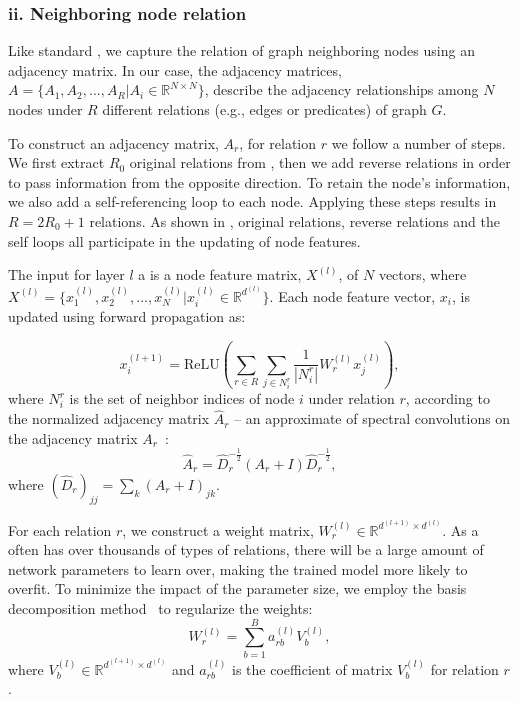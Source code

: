  \subsubsection{ii. Neighboring node relation}
 Like standard \RGCNs, we capture the relation of graph neighboring nodes using an adjacency matrix.
 In our case, the adjacency matrices, $A=\{A_1,A_2,...,A_R |A_i \in \mathbb{R}^{N
 \times N} \}$, describe the adjacency relationships among $N$ nodes under $R$ different relations (e.g., edges or predicates) of graph $G$.

 To construct an adjacency matrix, $A_r$, for relation $r$ we follow a number of steps. We first extract $R_0$ original
 relations from \KGs, then we add reverse relations in order to pass information from the opposite direction. To retain the node's
 information, we also add a self-referencing loop to each node. Applying these steps results in $R=2R_0+1$ relations. As shown in
 , original relations, reverse relations and the self loops all participate in the updating of node features.

 The input for layer $l$ a \RGCN is a node feature matrix, $X^{(l)}$, of $N$ vectors, where  $X^{(l)} =\{x^{(l)}_1,x^{(l)}_2,...,x^{(l)}_{N}
 |x^{(l)}_{i} \in \mathbb{R}^{d^{(l)}}\}$. Each node feature vector, $x_i$, is updated using forward propagation as:

	\begin{equation}
	x_i^{(l+1)}=\mathrm{ReLU} (\sum\limits_{r \in R}\sum\limits_{j \in N_i^r}\frac{1}{|N_i^r|}W_r^{(l)}x_j^{(l)}),
	\end{equation} where $N_i^r$ is the set of neighbor indices of node $i$ under relation $r$, according to the normalized adjacency
matrix $\hat A_r$ -- an approximate of spectral convolutions on the adjacency matrix $A_r$~\cite{Kipf2016Semi}:
	\begin{equation}
	\hat A_r=\hat D_r^{- \frac{1}{2}}(A_r+I)\hat D_r^{- \frac{1}{2}},
	\end{equation}
	where $(\hat D_r)_{jj}=\sum_k(A_r+I)_{jk}$.

	
	 For each relation $r$, we construct a weight matrix, $W_r^{(l)} \in \mathbb{R}^{d^{(l+1)}
\times d^{(l)}}$. As a \KG often has over thousands of types of relations, there will be a large amount of network parameters to learn
over, making the trained model more likely to overfit. To minimize the impact of the parameter size, we employ the basis decomposition
method~\cite{Schlichtkrull2017Modeling} to regularize the weights:
	\begin{equation}
	W_r^{(l)}=\sum\limits_{b=1}^B a_{rb}^{(l)}V_b^{(l)},
	\end{equation}
	where $V_b^{(l)} \in \mathbb{R}^{d^{(l+1)} \times d^{(l)}}$ and $a_{rb}^{(l)}$ is the coefficient of matrix $V_b^{(l)}$ for relation $r$.
	
